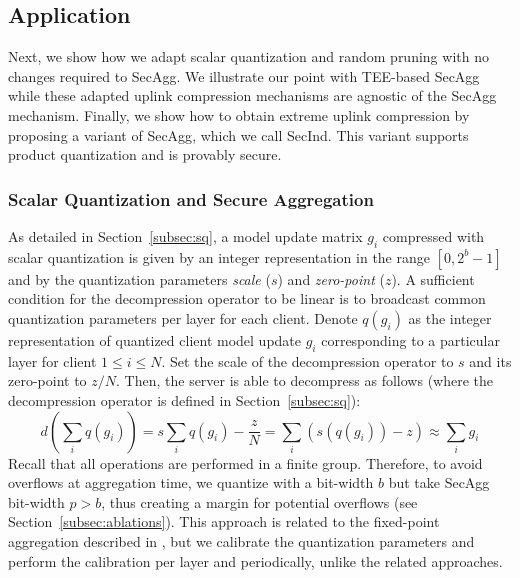 \documentclass[11pt]{article}
\newcommand{\SecInd}{{\sc SecInd}\xspace}
\newcommand{\SecAgg}{{\sc SecAgg}\xspace}
\newcommand{\ilya}[1]{{\color{red}Ilya: #1}}
\begin{document}
\subsection{Application}
Next, we show how we adapt scalar quantization and random pruning with no changes required to \SecAgg. We illustrate our point with TEE-based \SecAgg while these adapted uplink compression mechanisms are agnostic of the \SecAgg mechanism. Finally, we show how to obtain extreme uplink compression by proposing a variant of \SecAgg, which we call \SecInd. This variant supports product quantization and is provably secure.

\subsubsection{Scalar Quantization and Secure Aggregation}
\label{subsubsec:sq_sa}

As detailed in Section~\ref{subsec:sq}, a model update matrix $g_i$ compressed with scalar quantization is given by an integer representation in the range $[0, 2^{b}-1]$ and by the quantization parameters \emph{scale} ($s$) and \emph{zero-point} ($z$). A sufficient condition for the decompression operator to be linear is to broadcast common quantization parameters per layer for each client. Denote $q(g_i)$ as the integer representation of quantized client model update $g_i$ corresponding to a particular layer for client $1\leq i \leq N$.
Set the scale of the decompression operator to $s$ and its zero-point to $z/N$.
Then, the server is able to decompress as follows (where the decompression operator is defined in Section~\ref{subsec:sq}):
\begin{equation*}\textstyle
    d\left(\sum_i q(g_i)\right) = s\sum_i  q(g_i) -  \frac{z}{N}  = \sum_i \left( s(q(g_i)) - z \right) \approx \sum_i g_i
\end{equation*}
Recall that all operations are performed in a finite group. Therefore, to avoid overflows at aggregation time, we quantize with a bit-width $b$ but take \SecAgg bit-width $p > b$, thus creating a margin for potential overflows (see Section~\ref{subsec:ablations}).
%
This approach is related to the fixed-point aggregation described in \cite{Graham-bonavitz2019federated,Graham-huba2021papaya}, but we calibrate the quantization parameters and perform the calibration per layer and periodically, unlike the related approaches.
\end{document}
